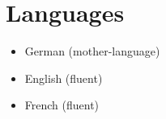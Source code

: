 \documentclass[11pt, a4paper]{awesome-cv}
\providecommand{\tightlist}{%
	\setlength{\itemsep}{0pt}\setlength{\parskip}{0pt}}
\begin{document}
\hypertarget{languages}{%
\section{\texorpdfstring{
Languages}{ Languages}}\label{languages}}

\begin{itemize}
\tightlist
\item
  German (mother-language)
\item
  English (fluent)
\item
  French (fluent)
\end{itemize}
\end{document}
